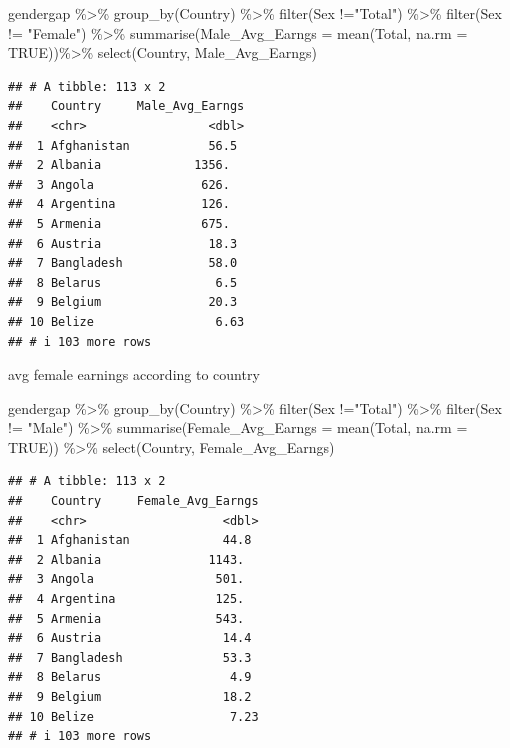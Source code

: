 \documentclass[
]{article}
\newenvironment{Shaded}{\begin{snugshade}}{\end{snugshade}}
\newcommand{\AttributeTok}[1]{\textcolor[rgb]{0.77,0.63,0.00}{#1}}
\newcommand{\ConstantTok}[1]{\textcolor[rgb]{0.00,0.00,0.00}{#1}}
\newcommand{\FunctionTok}[1]{\textcolor[rgb]{0.00,0.00,0.00}{#1}}
\newcommand{\NormalTok}[1]{#1}
\newcommand{\SpecialCharTok}[1]{\textcolor[rgb]{0.00,0.00,0.00}{#1}}
\newcommand{\StringTok}[1]{\textcolor[rgb]{0.31,0.60,0.02}{#1}}
\begin{document}
\begin{Shaded}
\begin{Highlighting}[]
\NormalTok{gendergap }\SpecialCharTok{\%\textgreater{}\%}
  \FunctionTok{group\_by}\NormalTok{(Country) }\SpecialCharTok{\%\textgreater{}\%}
  \FunctionTok{filter}\NormalTok{(Sex }\SpecialCharTok{!=}\StringTok{"Total"}\NormalTok{) }\SpecialCharTok{\%\textgreater{}\%}
  \FunctionTok{filter}\NormalTok{(Sex }\SpecialCharTok{!=} \StringTok{"Female"}\NormalTok{) }\SpecialCharTok{\%\textgreater{}\%}
  \FunctionTok{summarise}\NormalTok{(}\AttributeTok{Male\_Avg\_Earngs =} \FunctionTok{mean}\NormalTok{(Total, }\AttributeTok{na.rm =} \ConstantTok{TRUE}\NormalTok{))}\SpecialCharTok{\%\textgreater{}\%}
  \FunctionTok{select}\NormalTok{(Country, Male\_Avg\_Earngs)}
\end{Highlighting}
\end{Shaded}

\begin{verbatim}
## # A tibble: 113 x 2
##    Country     Male_Avg_Earngs
##    <chr>                 <dbl>
##  1 Afghanistan           56.5 
##  2 Albania             1356.  
##  3 Angola               626.  
##  4 Argentina            126.  
##  5 Armenia              675.  
##  6 Austria               18.3 
##  7 Bangladesh            58.0 
##  8 Belarus                6.5 
##  9 Belgium               20.3 
## 10 Belize                 6.63
## # i 103 more rows
\end{verbatim}

avg female earnings according to country

\begin{Shaded}
\begin{Highlighting}[]
\NormalTok{gendergap }\SpecialCharTok{\%\textgreater{}\%}
  \FunctionTok{group\_by}\NormalTok{(Country) }\SpecialCharTok{\%\textgreater{}\%}
  \FunctionTok{filter}\NormalTok{(Sex }\SpecialCharTok{!=}\StringTok{"Total"}\NormalTok{) }\SpecialCharTok{\%\textgreater{}\%}
  \FunctionTok{filter}\NormalTok{(Sex }\SpecialCharTok{!=} \StringTok{"Male"}\NormalTok{) }\SpecialCharTok{\%\textgreater{}\%}
  \FunctionTok{summarise}\NormalTok{(}\AttributeTok{Female\_Avg\_Earngs =} \FunctionTok{mean}\NormalTok{(Total, }\AttributeTok{na.rm =} \ConstantTok{TRUE}\NormalTok{)) }\SpecialCharTok{\%\textgreater{}\%}
  \FunctionTok{select}\NormalTok{(Country, Female\_Avg\_Earngs) }
\end{Highlighting}
\end{Shaded}

\begin{verbatim}
## # A tibble: 113 x 2
##    Country     Female_Avg_Earngs
##    <chr>                   <dbl>
##  1 Afghanistan             44.8 
##  2 Albania               1143.  
##  3 Angola                 501.  
##  4 Argentina              125.  
##  5 Armenia                543.  
##  6 Austria                 14.4 
##  7 Bangladesh              53.3 
##  8 Belarus                  4.9 
##  9 Belgium                 18.2 
## 10 Belize                   7.23
## # i 103 more rows
\end{verbatim}
\end{document}
